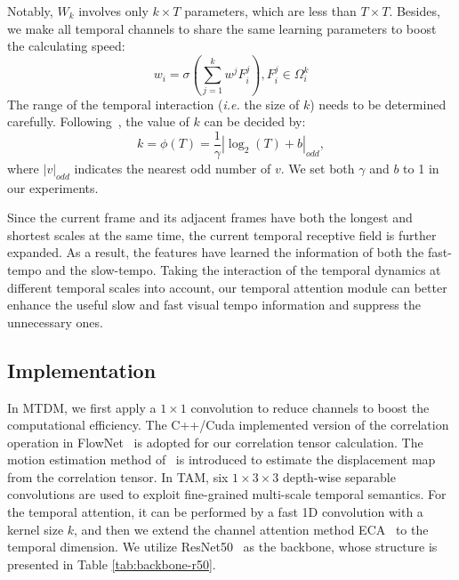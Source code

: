 \documentclass[journal]{IEEEtran}
\begin{document}
Notably, $W_{k}$ involves only $k \times T$ parameters, which are less than $T \times T$. Besides, we make all temporal channels to share the same learning parameters to boost the calculating speed:
\begin{equation}\label{eq:wishare}
  w_i = \sigma(\sum_{j=1}^{k}w^{j}F_{i}^{j}), F_{i}^{j}\in \Omega _{i}^{k}
\end{equation}
The range of the temporal interaction (\textit{i.e.} the size of $k$) needs to be determined carefully. Following~\cite{Wang_2020_CVPR_eca}, the value of $k$ can be decided by:
\begin{equation}\label{eq:k}
  k = \phi(T) = \frac{1}{\gamma}|\log_{2}(T) + b|_{odd},
\end{equation}
where $|v|_{odd}$ indicates the nearest odd number of $v$. We set both $\gamma$ and $b$ to 1 in our experiments.

Since the current frame and its adjacent frames have both the longest and shortest scales at the same time, the current temporal receptive field is further expanded. As a result, the features have learned the information of both the fast-tempo and the slow-tempo. Taking the interaction of the temporal dynamics at different temporal scales into account, our temporal attention module can better enhance the useful slow and fast visual tempo information and suppress the unnecessary ones.


\subsection{Implementation}
In MTDM, we first apply a $1\times 1$ convolution to reduce channels to boost the computational efficiency.
The C++/Cuda implemented version of the correlation operation in FlowNet~\cite{dosovitskiy2015flownet} is adopted for our correlation tensor calculation.
The motion estimation method of~\cite{kwon2020motionsqueeze} is introduced to estimate the displacement map from the correlation tensor.
In TAM, six $1\times 3 \times 3$ depth-wise separable convolutions are used to exploit fine-grained multi-scale temporal semantics. For the temporal attention, it can be performed by a fast 1D convolution with a kernel size $k$, and then we extend the channel attention method ECA~\cite{Wang_2020_CVPR_eca} to the temporal dimension.
We utilize ResNet50~\cite{he2016deep} as the backbone, whose structure is presented in Table \ref{tab:backbone-r50}.
\end{document}
